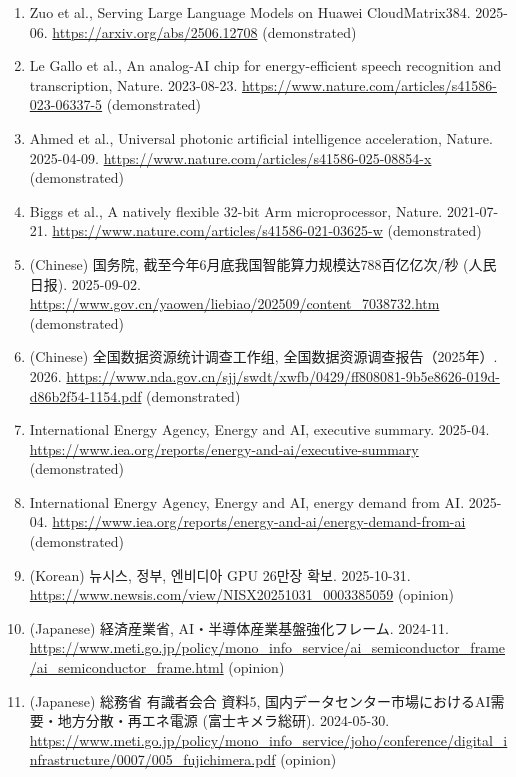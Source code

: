 \documentclass[10pt,letterpaper]{article}
\begin{document}
\begin{enumerate}
  DeepSeek-AI, DeepSeek-R1: Incentivizing Reasoning Capability in LLMs
  via Reinforcement Learning. 2025-01-22.
  \url{https://arxiv.org/abs/2501.12948} (demonstrated)
\item
  Zuo et al., Serving Large Language Models on Huawei CloudMatrix384.
  2025-06. \url{https://arxiv.org/abs/2506.12708} (demonstrated)
\item
  Le Gallo et al., An analog-AI chip for energy-efficient speech
  recognition and transcription, Nature. 2023-08-23.
  \url{https://www.nature.com/articles/s41586-023-06337-5}
  (demonstrated)
\item
  Ahmed et al., Universal photonic artificial intelligence acceleration,
  Nature. 2025-04-09.
  \url{https://www.nature.com/articles/s41586-025-08854-x}
  (demonstrated)
\item
  Biggs et al., A natively flexible 32-bit Arm microprocessor, Nature.
  2021-07-21. \url{https://www.nature.com/articles/s41586-021-03625-w}
  (demonstrated)
\item
  (Chinese) 国务院, 截至今年6月底我国智能算力规模达788百亿亿次/秒
  (人民日报). 2025-09-02.
  \url{https://www.gov.cn/yaowen/liebiao/202509/content_7038732.htm}
  (demonstrated)
\item
  (Chinese) 全国数据资源统计调查工作组, 全国数据资源调查报告（2025年）.
  2026.
  \url{https://www.nda.gov.cn/sjj/swdt/xwfb/0429/ff808081-9b5e8626-019d-d86b2f54-1154.pdf}
  (demonstrated)
\item
  International Energy Agency, Energy and AI, executive summary.
  2025-04.
  \url{https://www.iea.org/reports/energy-and-ai/executive-summary}
  (demonstrated)
\item
  International Energy Agency, Energy and AI, energy demand from AI.
  2025-04.
  \url{https://www.iea.org/reports/energy-and-ai/energy-demand-from-ai}
  (demonstrated)
\item
  (Korean) 뉴시스, 정부, 엔비디아 GPU 26만장 확보. 2025-10-31.
  \url{https://www.newsis.com/view/NISX20251031_0003385059} (opinion)
\item
  (Japanese) 経済産業省, AI・半導体産業基盤強化フレーム. 2024-11.
  \url{https://www.meti.go.jp/policy/mono_info_service/ai_semiconductor_frame/ai_semiconductor_frame.html}
  (opinion)
\item
  (Japanese) 総務省 有識者会合 資料5,
  国内データセンター市場におけるAI需要・地方分散・再エネ電源
  (富士キメラ総研). 2024-05-30.
  \url{https://www.meti.go.jp/policy/mono_info_service/joho/conference/digital_infrastructure/0007/005_fujichimera.pdf}
  (opinion)

\end{enumerate}
\end{document}
